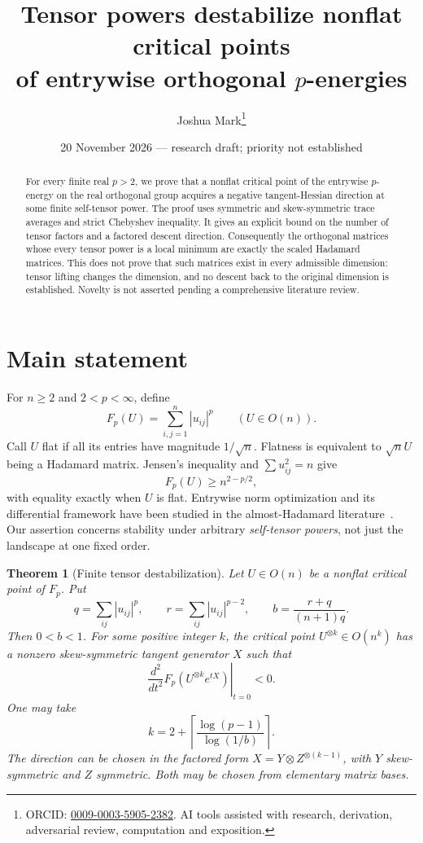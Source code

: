 \documentclass[11pt]{article}
\title{Tensor powers destabilize nonflat critical points\\of entrywise orthogonal $p$-energies}
\author{Joshua Mark\thanks{ORCID: \href{https://orcid.org/0009-0003-5905-2382}{0009-0003-5905-2382}. AI tools assisted with research, derivation, adversarial review, computation and exposition.}}
\date{20 November 2026 --- research draft; priority not established}
\newtheorem{theorem}{Theorem}[section]
\begin{document}
\maketitle
\begin{abstract}
For every finite real $p>2$, we prove that a nonflat critical point of
the entrywise $p$-energy on the real orthogonal group acquires a negative
tangent-Hessian direction at some finite self-tensor power. The proof
uses symmetric and skew-symmetric trace averages and strict Chebyshev
inequality. It gives an explicit bound on the number of tensor factors
and a factored descent direction. Consequently the orthogonal matrices
whose every tensor power is a local minimum are exactly the scaled
Hadamard matrices. This does not prove that such matrices exist in
every admissible dimension: tensor lifting changes the dimension, and
no descent back to the original dimension is established. Novelty is
not asserted pending a comprehensive literature review.
\end{abstract}

\section{Main statement}
For $n\ge2$ and $2<p<\infty$, define
\[
 F_p(U)=\sum_{i,j=1}^n |u_{ij}|^p\qquad(U\in O(n)).
\]
Call $U$ flat if all its entries have magnitude $1/\sqrt n$.
Flatness is equivalent to $\sqrt nU$ being a Hadamard matrix.
Jensen's inequality and $\sum u_{ij}^2=n$ give
\[
 F_p(U)\ge n^{2-p/2},
\]
with equality exactly when $U$ is flat. Entrywise norm optimization
and its differential framework have been studied in the almost-Hadamard
literature~\cite{BN}. Our assertion concerns stability under arbitrary
\emph{self-tensor powers}, not just the landscape at one fixed order.

\begin{theorem}[Finite tensor destabilization]\label{thm:main}
Let $U\in O(n)$ be a nonflat critical point of $F_p$. Put
\[
 q=\sum_{ij}|u_{ij}|^p,\qquad
 r=\sum_{ij}|u_{ij}|^{p-2},\qquad
 b=\frac{r+q}{(n+1)q}.
\]
Then $0<b<1$. For some positive integer $k$, the critical point
$U^{\otimes k}\in O(n^k)$ has a nonzero skew-symmetric tangent
generator $X$ such that
\[
 \left.\frac{d^2}{dt^2}F_p(U^{\otimes k}e^{tX})\right|_{t=0}<0.
\]
One may take
\begin{equation}\label{eq:kbound}
 k=2+\left\lceil\frac{\log(p-1)}{\log(1/b)}\right\rceil.
\end{equation}
The direction can be chosen in the factored form
$X=Y\otimes Z^{\otimes(k-1)}$, with $Y$ skew-symmetric and $Z$
symmetric. Both may be chosen from elementary matrix bases.
\end{theorem}
\end{document}
